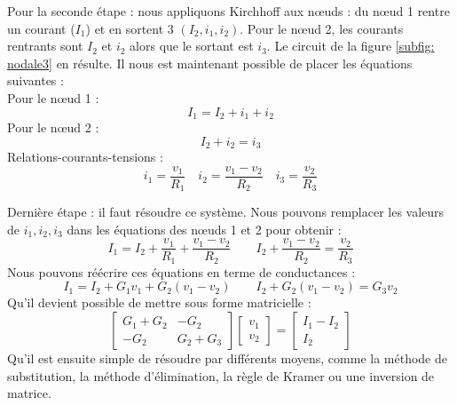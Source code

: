 \documentclass[12pt,a4paper]{article}
\begin{document}
Pour la seconde étape : nous appliquons Kirchhoff aux n\oe uds : du n\oe ud 1 rentre un courant ($I_1$) et en sortent 3 $(I_2, i_1, i_2)$. Pour le n\oe ud 2, les courants rentrants sont $I_2$ et $i_2$ alors que le sortant est $i_3$. Le circuit de la figure \ref{subfig: nodale3} en résulte. Il nous est maintenant possible de placer les équations suivantes :\\
Pour le n\oe ud 1 :
\[I_1 = I_2 + i_1 + i_2\]
Pour le n\oe ud 2 :
\[I_2 + i_2 = i_3\]
Relations-courants-tensions :
\[i_1 = \frac{v_1}{R_1} \quad i_2 = \frac{v_1-v_2}{R_2} \quad i_3 = \frac{v_2}{R_3}\]

Dernière étape : il faut résoudre ce système. Nous pouvons remplacer les valeurs de $i_1,i_2,i_3$ dans les équations des n\oe uds 1 et 2 pour obtenir :
\[I_1 = I_2 + \frac{v_1}{R_1} + \frac{v_1 - v_2 }{R_2} \qquad I_2 + \frac{v_1-v_2}{R_2} = \frac{v_2}{R_3}\]
Nous pouvons réécrire ces équations en terme de conductances :
\[I_1 = I_2 + G_1v_1 +G_2(v_1-v_2) \qquad I_2 + G_2(v_1-v_2) = G_3v_2\]
Qu'il devient possible de mettre sous forme matricielle :
\[\begin{bmatrix}
	G_1 + G_2 & -G_2\\
	-G_2 & G_2 + G_3
\end{bmatrix}
\begin{bmatrix}
v_1\\
v_2
\end{bmatrix}
=
\begin{bmatrix}
I_1 - I_2\\
I_2
\end{bmatrix}
\]
Qu'il est ensuite simple de résoudre par différents moyens, comme la méthode de substitution, la méthode d'élimination, la règle de Kramer ou une inversion de matrice.
\end{document}

